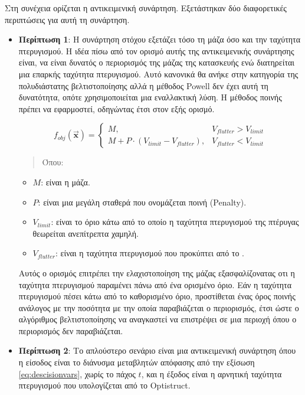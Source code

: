 Στη συνέχεια ορίζεται η αντικειμενική συνάρτηση. Εξετάστηκαν δύο διαφορετικές περιπτώσεις για αυτή τη συνάρτηση.

\begin{itemize}
\item
  \textbf{Περίπτωση 1}: Η συνάρτηση στόχου εξετάζει τόσο τη μάζα όσο και την ταχύτητα πτερυγισμού. Η ιδέα πίσω από τον ορισμό αυτής της αντικειμενικής συνάρτησης  είναι, να είναι δυνατός ο περιορισμός της μάζας της κατασκευής ενώ διατηρείται μια επαρκής ταχύτητα πτερυγισμού. Αυτό κανονικά θα ανήκε στην κατηγορία της πολυδιάστατης βελτιστοποίησης αλλά η μέθοδος \textlatin{Powell} δεν έχει αυτή τη δυνατότητα, οπότε χρησιμοποιείται μια εναλλακτική λύση. Η μέθοδος ποινής πρέπει να εφαρμοστεί, οδηγώντας έτσι στον εξής ορισμό.


\begin{equation}
    f_{obj}\left( \vec{\mathbf{x}} \right) =
    \begin{cases} 
        M, & V_{flutter} > V_{limit} \\
        M + P \cdot \left( V_{limit} - V_{flutter} \right), & V_{flutter} < V_{limit}
    \end{cases}
    \label{eq:objpowell1}
\end{equation}

\begin{quote}
Όπου:
\end{quote}

\begin{itemize}
  \item
    \(M\): είναι η μάζα.
  \item
    \(P\): είναι μια μεγάλη σταθερά που ονομάζεται ποινή \textlatin{(Penalty)}.
  \item
    \(V_{limit}\): είναι το όριο κάτω από το οποίο η ταχύτητα πτερυγισμού της πτέρυγας θεωρείται ανεπίτρεπτα χαμηλή.
  \item
    \(V_{flutter}\): είναι η ταχύτητα πτερυγισμού που προκύπτει από το .
  \end{itemize}
  
  Αυτός ο ορισμός επιτρέπει την ελαχιστοποίηση της μάζας εξασφαλίζονατας οτι η ταχύτητα πτερυγισμού παραμένει πάνω από ένα ορισμένο όριο. Εάν η ταχύτητα πτερυγισμού πέσει κάτω από το καθορισμένο όριο, προστίθεται ένας όρος ποινής ανάλογος με την ποσότητα με την οποία παραβιάζεται ο περιορισμός, έτσι ώστε ο αλγόριθμος βελτιστοποίησης να αναγκαστεί να επιστρέψει σε μια περιοχή όπου ο περιορισμός δεν παραβιάζεται.
  

  \item
  \textbf{Περίπτωση 2}: Το απλούστερο σενάριο είναι μια αντικειμενική συνάρτηση όπου η είσοδος είναι το διάνυσμα μεταβλητών απόφασης από την εξίσωση \eqref{eq:descisionvars}, χωρίς το πάχος \(t\), και η έξοδος είναι η αρνητική ταχύτητα πτερυγισμού που υπολογίζεται από το \textlatin{Optistruct}.

\end{itemize}

